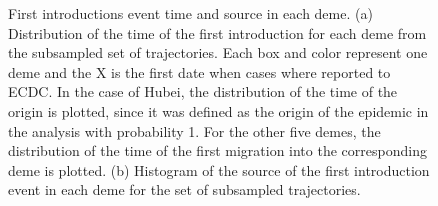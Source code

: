 \documentclass[12pt,]{article}
\begin{document}
\begin{figure}[!tbp]
  \centering
  \caption{First introductions event time and source in each deme. (a) Distribution of the time of the first introduction for each deme from the subsampled set of trajectories. Each box and color represent one deme and the X is the first date when cases where reported to ECDC. In the case of Hubei, the distribution of the time of the origin is plotted, since it was defined as the origin of the epidemic in the analysis with probability 1. For the other five demes, the distribution of the time of the first migration into the corresponding deme is plotted. (b) Histogram of the source of the first introduction event in each deme for the set of subsampled trajectories.}
\end{figure}
\end{document}
